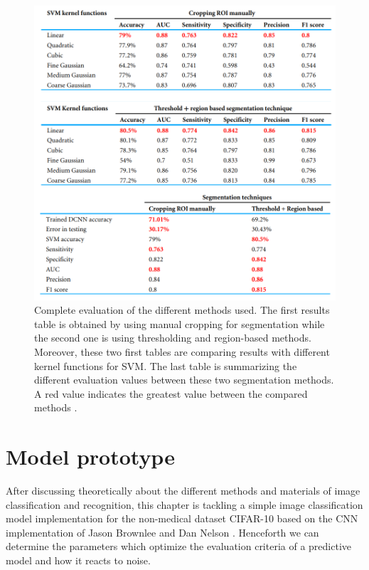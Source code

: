 \documentclass[11pt, openany]{report}
\theoremstyle{plain}
\theoremstyle{definition}
\theoremstyle{remark}
\begin{document}
\newpage
\hspace*{0mm}\vfill
\begin{figure}[H]
  \centering
  \includegraphics[scale=0.465]{figures/eval-article.png}
  \caption{Complete evaluation of the different methods used. The first results table is obtained by using manual cropping for segmentation while the second one is using thresholding and region-based methods. Moreover, these two first tables are comparing results with different kernel functions for SVM. The last table is summarizing the different evaluation values between these two segmentation methods. A red value indicates the greatest value between the compared methods \cite{breast-cancer}.}
  \label{fig:eval-article}
\end{figure}
\vfill\hspace*{0mm}


\chapter{Model prototype}

After discussing theoretically about the different methods and materials of image classification and recognition, this chapter is tackling a simple image classification model implementation for the non-medical dataset CIFAR-10 \cite{CIFAR10} based on the CNN implementation of Jason Brownlee \cite{CIFAR10-implementation-1} and Dan Nelson \cite{CIFAR10-implementation-2}. Henceforth we can determine the parameters which optimize the evaluation criteria of a predictive model and how it reacts to noise. 
\end{document}
